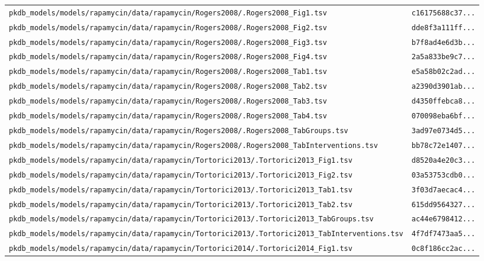 \begin{longtable}{ll}
\texttt{pkdb\_models/models/rapamycin/data/rapamycin/Rogers2008/.Rogers2008\_Fig1.tsv} & \texttt{c16175688c37...} \\
\texttt{pkdb\_models/models/rapamycin/data/rapamycin/Rogers2008/.Rogers2008\_Fig2.tsv} & \texttt{dde8f3a111ff...} \\
\texttt{pkdb\_models/models/rapamycin/data/rapamycin/Rogers2008/.Rogers2008\_Fig3.tsv} & \texttt{b7f8ad4e6d3b...} \\
\texttt{pkdb\_models/models/rapamycin/data/rapamycin/Rogers2008/.Rogers2008\_Fig4.tsv} & \texttt{2a5a833be9c7...} \\
\texttt{pkdb\_models/models/rapamycin/data/rapamycin/Rogers2008/.Rogers2008\_Tab1.tsv} & \texttt{e5a58b02c2ad...} \\
\texttt{pkdb\_models/models/rapamycin/data/rapamycin/Rogers2008/.Rogers2008\_Tab2.tsv} & \texttt{a2390d3901ab...} \\
\texttt{pkdb\_models/models/rapamycin/data/rapamycin/Rogers2008/.Rogers2008\_Tab3.tsv} & \texttt{d4350ffebca8...} \\
\texttt{pkdb\_models/models/rapamycin/data/rapamycin/Rogers2008/.Rogers2008\_Tab4.tsv} & \texttt{070098eba6bf...} \\
\texttt{pkdb\_models/models/rapamycin/data/rapamycin/Rogers2008/.Rogers2008\_TabGroups.tsv} & \texttt{3ad97e0734d5...} \\
\texttt{pkdb\_models/models/rapamycin/data/rapamycin/Rogers2008/.Rogers2008\_TabInterventions.tsv} & \texttt{bb78c72e1407...} \\
\texttt{pkdb\_models/models/rapamycin/data/rapamycin/Tortorici2013/.Tortorici2013\_Fig1.tsv} & \texttt{d8520a4e20c3...} \\
\texttt{pkdb\_models/models/rapamycin/data/rapamycin/Tortorici2013/.Tortorici2013\_Fig2.tsv} & \texttt{03a53753cdb0...} \\
\texttt{pkdb\_models/models/rapamycin/data/rapamycin/Tortorici2013/.Tortorici2013\_Tab1.tsv} & \texttt{3f03d7aecac4...} \\
\texttt{pkdb\_models/models/rapamycin/data/rapamycin/Tortorici2013/.Tortorici2013\_Tab2.tsv} & \texttt{615dd9564327...} \\
\texttt{pkdb\_models/models/rapamycin/data/rapamycin/Tortorici2013/.Tortorici2013\_TabGroups.tsv} & \texttt{ac44e6798412...} \\
\texttt{pkdb\_models/models/rapamycin/data/rapamycin/Tortorici2013/.Tortorici2013\_TabInterventions.tsv} & \texttt{4f7df7473aa5...} \\
\texttt{pkdb\_models/models/rapamycin/data/rapamycin/Tortorici2014/.Tortorici2014\_Fig1.tsv} & \texttt{0c8f186cc2ac...} \\

\end{longtable}

